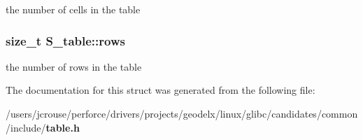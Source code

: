 the number of cells in the table 
\subsubsection{\setlength{\rightskip}{0pt plus 5cm}size\_\-t S\_\-table::rows}\label{structS__table_m0}


the number of rows in the table 

The documentation for this struct was generated from the following file:\begin{CompactItemize}
\item 
/users/jcrouse/perforce/drivers/projects/geodelx/linux/glibc/candidates/common/include/{\bf table.h}\end{CompactItemize}
